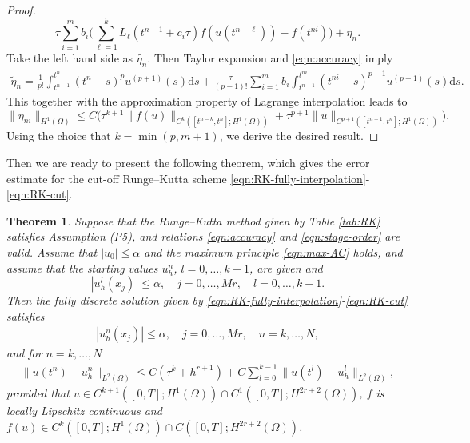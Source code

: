 \documentclass[a4paper, oneside]{book}
\def\d{{\mathrm{d}}}
\def\d{\mathrm{d}}
\def\II{(\Omega)}
\newtheorem{theorem}{Theorem}[section]
\begin{document}
\begin{proof}
\begin{equation*}
    \tau \sum_{i=1}^m b_i  \Big(\sum_{\ell=1}^k L_{\ell}(t^{n-1}+c_i\tau) f(u(t^{n-\ell})) - f(t^{ni})\Big)  +
    \eta_{n}.
\end{equation*}
Take the left hand side as $\tilde{\eta_n}$. Then Taylor expansion and \eqref{eqn:accuracy} imply
\begin{equation*}
\begin{aligned}
\tilde\eta_{n} =\frac1{p!}\int_{t^{n-1}}^{t^n} (t^n-s)^p u^{(p+1)}(s) \d s
+ \frac\tau{(p-1)!}\sum_{i=1}^mb_i\int_{t^{n-1}}^{t^{ni}}
(t^{ni}-s)^{p-1} u^{(p+1)}(s) \d s.
\end{aligned}
\end{equation*}
This together with the approximation property of Lagrange interpolation leads to
\begin{equation*}
     \|\eta_{ni}\|_{H^1(\Omega)} \leq C\Big(\tau^{k+1} \| f(u)  \|_{C^{k}([t^{n-k},t^n]; H^1\II)}
    + \tau^{p+1} \|u \|_{C^{p+1}([t^{n-1},t^n];H^1(\Omega))} \Big).
\end{equation*}
Using the choice that $k=\min(p, m+1)$, we derive the desired result.
\end{proof}







Then we are ready to present the following theorem, which gives the error estimate for the
cut-off Runge--Kutta scheme \eqref{eqn:RK-fully-interpolation}-\eqref{eqn:RK-cut}.

\begin{theorem}\label{thm:RK-error}
Suppose that the Runge--Kutta method given by Table \ref{tab:RK} satisfies Assumption (P5),
and relations \eqref{eqn:accuracy} and \eqref{eqn:stage-order}  are valid.
Assume that $|u_0| \le \alpha$ and the maximum principle \eqref{eqn:max-AC} holds,
 and assume that the starting values $u_h^n$, $l=0,\dots,k-1$, are given and
$$
|u_h^l(x_j)|\le \alpha , \quad j=0,\dots,Mr,\quad l=0,\dots,k-1.
$$
Then the   {fully discrete} solution given by \eqref{eqn:RK-fully-interpolation}-\eqref{eqn:RK-cut} satisfies
\begin{align*}
|u_h^n(x_j)|\le \alpha , \quad j=0,\dots,Mr,\quad n=k,\dots,N,
\end{align*}
and  {for $n=k,\ldots,N$}
\begin{align*}
  \| u(t^n) - u_h^n \|_{L^2(\Omega)} \le  C(\tau^k + h^{r+1}) + C\sum_{l=0}^{k-1}\| u(t^l) - u_h^l \|_{L^2(\Omega)} ,
\end{align*}
provided that {$u\in C^{k+1}([0,T]; H^1\II) \cap C^1([0,T];H^{2r+2}(\Omega))$,
$f$ is locally Lipschitz continuous and $f(u)\in C^k([0,T];H^1\II)\cap C([0,T];H^{2r+2}\II)$.}
\end{theorem}
\end{document}
